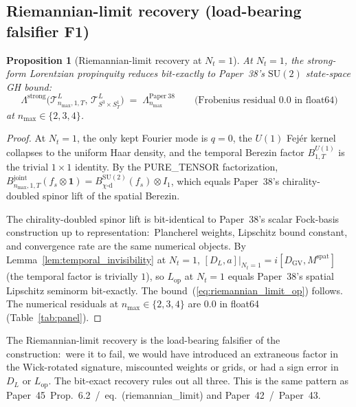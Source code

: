 \documentclass[11pt,a4paper]{article}
\theoremstyle{plain}
\newtheorem{proposition}[theorem]{Proposition}
\theoremstyle{definition}
\newcommand{\nmax}{n_{\max}}
\newcommand{\Nt}{N_{t}}
\newcommand{\Manifold}{S^{3}\times S^{1}_{T}}
\newcommand{\Tcal}{\mathcal{T}}
\newcommand{\SU}{\mathrm{SU}}
\newcommand{\Uone}{U(1)}
\newcommand{\DGV}{D_{\mathrm{GV}}}
\newcommand{\DL}{D_{L}}
\newcommand{\Lprop}{\Lambda^{\mathrm{strong}}}
\newcommand{\Lambdab}{\Lambda}
\newcommand{\Lop}{L_{\mathrm{op}}}
\newcommand{\Bjoint}{B^{\mathrm{joint}}}
\newcommand{\spat}{\mathrm{spat}}
\newcommand{\chid}{\chi\text{-d}}
\begin{document}
\subsection{Riemannian-limit recovery (load-bearing falsifier F1)}
\label{sec:riemannian_limit}

\begin{proposition}[Riemannian-limit recovery at $\Nt = 1$]
\label{prop:riemannian_limit_op}
At $\Nt = 1$, the strong-form Lorentzian propinquity reduces
bit-exactly to Paper~38's $\SU(2)$ state-space GH bound:
\begin{equation}\label{eq:riemannian_limit_op}
   \Lprop\!\bigl(\Tcal^{L}_{\nmax, 1, T},\, \Tcal^{L}_{\Manifold}\bigr)
   \;=\; \Lambdab^{\mathrm{Paper~38}}_{\nmax}
   \qquad \text{(Frobenius residual $0.0$ in float64)}
\end{equation}
at $\nmax \in \{2, 3, 4\}$.
\end{proposition}

\begin{proof}
At $\Nt = 1$, the only kept Fourier mode is $q = 0$, the $\Uone$
Fej\'er kernel collapses to the uniform Haar density, and the temporal
Berezin factor $B^{\Uone}_{1, T}$ is the trivial $1 \times 1$ identity.
By the PURE\_TENSOR factorization,
$\Bjoint_{\nmax, 1, T}(f_{s} \otimes \mathbf{1}) =
B^{\SU(2)}_{\chid}(f_{s}) \otimes I_{1}$, which equals Paper~38's
chirality-doubled spinor lift of the spatial Berezin.

The chirality-doubled spinor lift is bit-identical to Paper~38's
scalar Fock-basis construction up to representation:\ Plancherel
weights, Lipschitz bound constant, and convergence rate are the same
numerical objects. By Lemma~\ref{lem:temporal_invisibility} at
$\Nt = 1$, $[\DL, a]|_{\Nt = 1} = i[\DGV, M^{\spat}]$ (the temporal
factor is trivially $1$), so $\Lop$ at $\Nt = 1$ equals Paper~38's
spatial Lipschitz seminorm bit-exactly. The bound~(\ref{eq:riemannian_limit_op})
follows. The numerical residuals at $\nmax \in \{2, 3, 4\}$ are
$0.0$ in float64 (Table~\ref{tab:panel}). \qedhere
\end{proof}

The Riemannian-limit recovery is the load-bearing falsifier of the
construction:\ were it to fail, we would have introduced an extraneous
factor in the Wick-rotated signature, miscounted weights or grids, or
had a sign error in $\DL$ or $\Lop$. The bit-exact recovery rules out
all three. This is the same pattern as Paper~45~Prop.~6.2~/~eq.~(riemannian\_limit)
and Paper~42~/~Paper~43.
\end{document}
